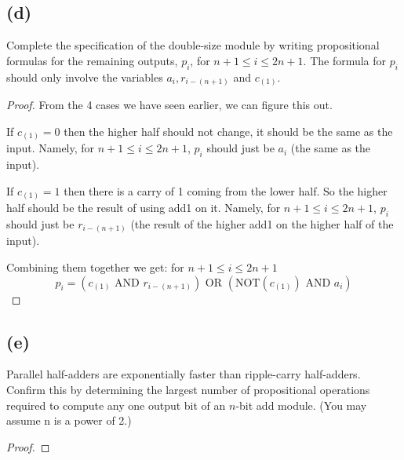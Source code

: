 \documentclass[14pt]{extarticle}
\begin{document}
\subsection{(d)}
Complete the specification of the double-size module by writing propositional formulas for the remain­ing outputs, $p_i$, for $n+1 \leq i \leq 2n+1$. The formula for $p_i$ should only involve the variables $a_i, r_{i - (n+1)}$ and $c_{(1)}$.
\begin{proof}
From the 4 cases we have seen earlier, we can figure this out.

If $c_{(1)} = 0$ then the higher half should not change, it should be the same as the input. Namely, for $n+1 \leq i \leq 2n+1$, $p_i$ should just be $a_i$ (the same as the input).

If $c_{(1)} = 1$ then there is a carry of 1 coming from the lower half. So the higher half should be the result of using add1 on it. Namely, for $n+1 \leq i \leq 2n+1$, $p_i$ should just be $r_{i - (n+1)}$ (the result of the higher add1 on the higher half of the input).

Combining them together we get: for $n+1 \leq i \leq 2n+1$
$$
p_i = (c_{(1)} \text{ AND } r_{i - (n+1)}) \text{ OR } (\text{NOT}(c_{(1)}) \text{ AND } a_i)
$$

\end{proof}
\subsection{(e)}
Parallel half-adders are exponentially faster than ripple-carry half-adders. Confirm this by determining the largest number of propositional operations required to compute any one output bit of an $n$-bit add module. (You may assume n is a power of 2.)
\begin{proof}
\end{proof}
\end{document}
